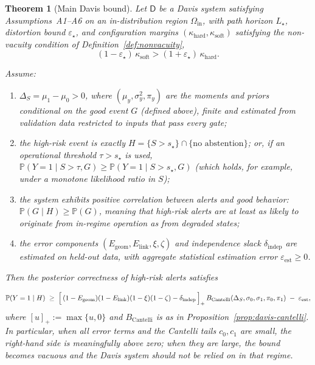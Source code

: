 \documentclass[11pt]{article}
\newcommand{\Prob}{\mathbb{P}}
\newtheorem{theorem}{Theorem}
\theoremstyle{remark}
\theoremstyle{plain}
\begin{document}
\begin{theorem}[Main Davis bound]
\label{thm:davis-main}
Let $\mathsf{D}$ be a Davis system satisfying Assumptions~A1–A6 on an in-distribution region
$\Omega_{\mathrm{in}}$, with path horizon $L_\star$, distortion bound $\varepsilon_\star$, and
configuration margins $(\kappa_{\mathrm{hard}}, \kappa_{\mathrm{soft}})$ satisfying the non-vacuity
condition of Definition~\ref{def:nonvacuity},
\[
(1-\varepsilon_\star)\,\kappa_{\mathrm{soft}} > (1+\varepsilon_\star)\,\kappa_{\mathrm{hard}}.
\]

Assume:
\begin{enumerate}[label=(\roman*), leftmargin=2em]
  \item $\Delta_S = \mu_1 - \mu_0 > 0$, where $(\mu_y,\sigma_y^2,\pi_y)$ are the moments and priors
    \emph{conditional on the good event $G$} (defined above), finite and estimated from validation data
    restricted to inputs that pass every gate;
  \item the high-risk event is exactly $H = \{S > s_\star\} \cap \{\text{no abstention}\}$; or, if an operational
    threshold $\tau > s_\star$ is used, $\Prob(Y=1 \mid S > \tau, G) \ge \Prob(Y=1 \mid S > s_\star, G)$ (which holds,
    for example, under a monotone likelihood ratio in $S$);
  \item the system exhibits positive correlation between alerts and good behavior: 
    $\mathbb{P}(G \mid H) \ge \mathbb{P}(G)$, meaning that high-risk alerts are at least as 
    likely to originate from in-regime operation as from degraded states;
  \item the error components $(E_{\mathrm{geom}}, E_{\mathrm{link}}, \xi, \zeta)$ and independence
    slack $\delta_{\mathrm{indep}}$ are estimated on held-out data, with aggregate statistical
    estimation error $\varepsilon_{\mathrm{est}} \ge 0$.
\end{enumerate}

Then the posterior correctness of high-risk alerts satisfies

\begin{equation}
\label{eq:main-davis-bound}
\Prob(Y=1 \mid H)
\;\ge\;
\Bigl[\,(1-E_{\mathrm{geom}})(1-E_{\mathrm{link}})
       (1-\xi)(1-\zeta) - \delta_{\mathrm{indep}}\,\Bigr]_+\,
B_{\mathrm{Cantelli}}(\Delta_S,\sigma_0,\sigma_1,\pi_0,\pi_1)
\;-\; \varepsilon_{\mathrm{est}},
\end{equation}
where $[u]_+ := \max\{u,0\}$ and $B_{\mathrm{Cantelli}}$ is as in
Proposition~\ref{prop:davis-cantelli}. In particular, when all error terms and the Cantelli tails
$c_0,c_1$ are small, the right-hand side is meaningfully above zero; when they are large, the bound
becomes vacuous and the Davis system should not be relied on in that regime.
\end{theorem}
\end{document}
